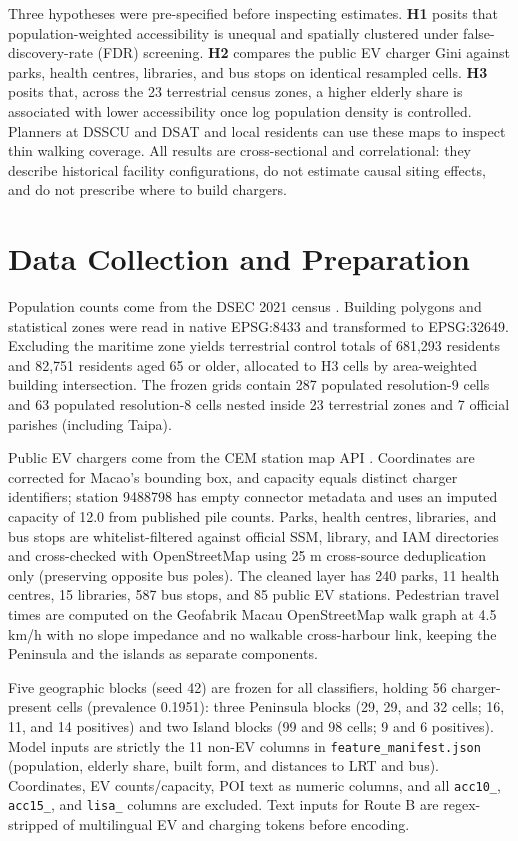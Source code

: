 \documentclass[11pt,a4paper]{article}
\begin{document}
Three hypotheses were pre-specified before inspecting estimates. \textbf{H1} posits that population-weighted accessibility is unequal and spatially clustered under false-discovery-rate (FDR) screening. \textbf{H2} compares the public EV charger Gini against parks, health centres, libraries, and bus stops on identical resampled cells. \textbf{H3} posits that, across the 23 terrestrial census zones, a higher elderly share is associated with lower accessibility once log population density is controlled. Planners at DSSCU and DSAT and local residents can use these maps to inspect thin walking coverage. All results are cross-sectional and correlational: they describe historical facility configurations, do not estimate causal siting effects, and do not prescribe where to build chargers.

\section{Data Collection and Preparation}
Population counts come from the DSEC 2021 census \citep{dsec2021}. Building polygons and statistical zones were read in native EPSG:8433 and transformed to EPSG:32649. Excluding the maritime zone yields terrestrial control totals of 681,293 residents and 82,751 residents aged 65 or older, allocated to H3 cells by area-weighted building intersection. The frozen grids contain 287 populated resolution-9 cells and 63 populated resolution-8 cells nested inside 23 terrestrial zones and 7 official parishes (including Taipa).

Public EV chargers come from the CEM station map API \citep{cem2026}. Coordinates are corrected for Macao's bounding box, and capacity equals distinct charger identifiers; station 9488798 has empty connector metadata and uses an imputed capacity of 12.0 from published pile counts. Parks, health centres, libraries, and bus stops are whitelist-filtered against official SSM, library, and IAM directories and cross-checked with OpenStreetMap \citep{osm2026} using 25 m cross-source deduplication only (preserving opposite bus poles). The cleaned layer has 240 parks, 11 health centres, 15 libraries, 587 bus stops, and 85 public EV stations. Pedestrian travel times are computed on the Geofabrik Macau OpenStreetMap walk graph \citep{osm2026} at 4.5 km/h with no slope impedance and no walkable cross-harbour link, keeping the Peninsula and the islands as separate components.

Five geographic blocks (seed 42) are frozen for all classifiers, holding 56 charger-present cells (prevalence 0.1951): three Peninsula blocks (29, 29, and 32 cells; 16, 11, and 14 positives) and two Island blocks (99 and 98 cells; 9 and 6 positives). Model inputs are strictly the 11 non-EV columns in \texttt{feature\_manifest.json} (population, elderly share, built form, and distances to LRT and bus). Coordinates, EV counts/capacity, POI text as numeric columns, and all \texttt{acc10\_}, \texttt{acc15\_}, and \texttt{lisa\_} columns are excluded. Text inputs for Route B are regex-stripped of multilingual EV and charging tokens before encoding.
\end{document}
